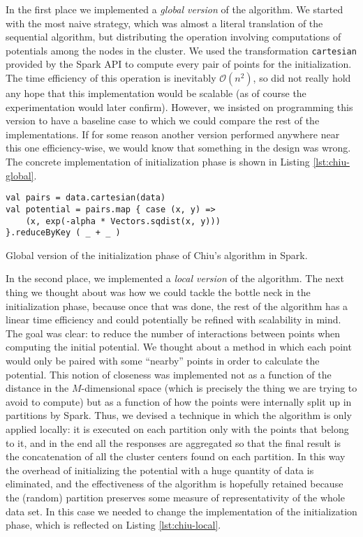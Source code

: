 In the first place we implemented a \textit{global version} of the algorithm. We started with the most naive strategy, which was almost a literal translation of the sequential algorithm, but distributing the operation involving computations of potentials among the nodes in the cluster. We used the transformation \verb|cartesian| provided by the Spark API to compute every pair of points for the initialization. The time efficiency of this operation is inevitably $\mathcal O(n^2)$, so did not really hold any hope that this implementation would be scalable (as of course the experimentation would later confirm). However, we insisted on programming this version to have a baseline case to which we could compare the rest of the implementations. If for some reason another version performed anywhere near this one efficiency-wise, we would know that something in the design was wrong. The concrete implementation of initialization phase is shown in Listing \ref{lst:chiu-global}.

\begin{Listing}[h!]
\begin{lstlisting}[basicstyle=\normalsize\ttfamily, xleftmargin=.5cm, aboveskip=0em, belowskip=0em]
val pairs = data.cartesian(data)
val potential = pairs.map { case (x, y) =>
    (x, exp(-alpha * Vectors.sqdist(x, y)))
}.reduceByKey ( _ + _ )
\end{lstlisting}
\caption{Global version of the initialization phase of Chiu's algorithm in Spark.}
  \label{lst:chiu-global}
\end{Listing}

In the second place, we implemented a \textit{local version} of the algorithm. The next thing we thought about was how we could tackle the bottle neck in the initialization phase, because once that was done, the rest of the algorithm has a linear time efficiency and could potentially be refined with scalability in mind. The goal was clear: to reduce the number of interactions between points when computing the initial potential. We thought about a method in which each point would only be paired with some ``nearby'' points in order to calculate the potential. This notion of closeness was implemented not as a function of the distance in the $M$-dimensional space (which is precisely the thing we are trying to avoid to compute) but as a function of how the points were internally split up in partitions by Spark. Thus, we devised a technique in which the algorithm is only applied locally: it is executed on each partition only with the points that belong to it, and in the end all the responses are aggregated so that the final result is the concatenation of all the cluster centers found on each partition. In this way the overhead of initializing the potential with a huge quantity of data is eliminated, and the effectiveness of the algorithm is hopefully retained because the (random) partition preserves some measure of representativity of the whole data set. In this case we needed to change the implementation of the initialization phase, which is reflected on Listing \ref{lst:chiu-local}.

